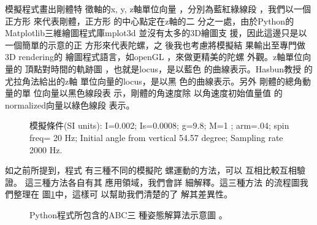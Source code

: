 \documentclass[12pt,twoside]{article}
\begin{document}
\bigskip

%
\begin{mdframed}[leftline=false, rightline=false,backgroundcolor=bg]
\inputminted[linenos,fontsize=\footnotesize]{python}{../../Scripts/cordtrans/Gyroscope-Demo-LatexImport.py}
\end{mdframed}%
\bigskip

模擬程式畫出剛體特%
徵軸的x, y, z軸單位向量%
，分別為藍紅綠線段%
，我們以一個正方形%
來代表剛體，正方形%
的中心點定在z軸的二%
分之一處，由於Python的%
Matplotlib三維繪圖程式庫mplot3d%
並沒有太多的3D繪圖支%
援，因此這邊只是以%
一個簡單的示意的正%
方形來代表陀螺，之%
後我也考慮將模擬結%
果輸出至專門做3D rendering的%
繪圖程式語言，如openGL%
，來做更精美的陀螺%
外觀。z軸單位向量的%
頂點對時間的軌跡圖%
，也就是locus，是以藍色%
的曲線表示。Hasbun教授%
的尤拉角法給出的z軸%
單位向量的locus，是以黑%
色的曲線表示。另外%
剛體的總角動量的單%
位向量以黑色線段表%
示，剛體的角速度除%
以角速度初始值量值%
的normalized向量以綠色線段%
表示。

\begin{figure}[th]
\caption{模擬條件(SI units): I=0.002; Is=0.0008;
g=9.8; M=1 ; arm=.04; spin freq= 20 Hz; Initial angle from vertical 54.57
degree; Sampling rate 2000 Hz.}
\begin{center}
\fbox{}
\end{center}
\end{figure}

\bigskip

如之前所提到，程式%
有三種不同的模擬陀%
螺運動的方法，可以%
互相比較互相驗證。%
這三種方法各自有其%
應用領域，我們會詳%
細解釋。這三種方法%
的流程圖我們整理在%
圖\ref{ABCmethodsIllustration}中，這樣可%
以幫助我們清楚的了%
解其差異性。

\begin{figure}[th]
\caption{Python程式所包含的ABC三%
種姿態解算法示意圖%
。}
\label{ABCmethodsIllustration}
\begin{center}

\end{center}
\end{figure}

\bigskip
\end{document}
